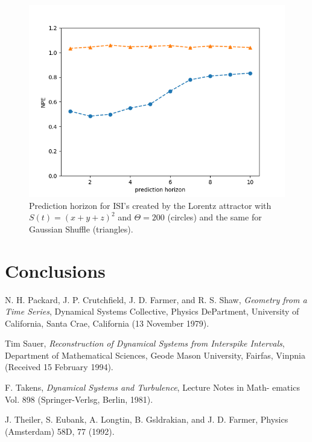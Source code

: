 \documentclass[10pt]{article}
\begin{document}
\begin{figure}[h!]
\centering
\includegraphics[scale=0.5]{prediction}
\caption{Prediction horizon for ISI's created by the Lorentz attractor with $S(t)=(x+y+z)^2$ and $\Theta = 200$ (circles) and the same for Gaussian Shuffle (triangles). }
\label{fig:distributions}
\end{figure}

\section{Conclusions}

\begin{thebibliography}{99}
 
N. H. Packard, J. P. Crutchfield, J. D. Farmer, and R. S. Shaw, {\it Geometry from a Time Series}, Dynamical Systems Collective, Physics DePartment, University of California, Santa Crae, California (13 November 1979).

Tim Sauer, {\it Reconstruction of Dynamical Systems from Interspike Intervals}, Department of Mathematical Sciences, Geode Mason University, Fairfas, Vinpnia (Received 15 February 1994).

F. Takens, {\it Dynamical Systems and Turbulence}, Lecture Notes in Math-
ematics Vol. 898 (Springer-Verlsg, Berlin, 1981).

J. Theiler, S. Eubank, A. Longtin, B. Gsldrakian, and
J. D. Farmer, Physics (Amsterdam) 58D, 77 (1992).

\end{thebibliography}
\end{document}
